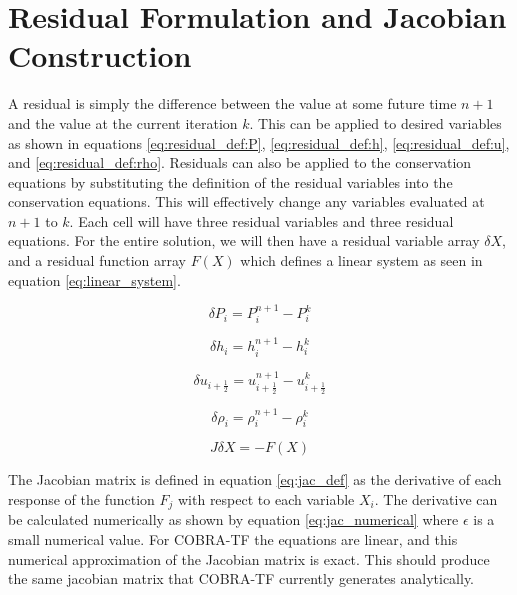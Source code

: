 \vspace*{-80mm}
\chapter{Residual Formulation and Jacobian Construction}
\label{chapter3:residual_formulation}
	    
    A residual is simply the difference between the value at some future time
    $n+1$ and the value at the current iteration $k$. This can be applied to
    desired variables as shown in equations %
    \eqref{eq:residual_def:P}, \eqref{eq:residual_def:h},
    \eqref{eq:residual_def:u}, and \eqref{eq:residual_def:rho}. Residuals can
    also be applied to the conservation equations by substituting the definition
    of the residual variables into the conservation equations. This will
    effectively change any variables evaluated at $n+1$ to $k$. Each cell will
    have three residual variables and three residual equations. For the entire
    solution, we will then have a residual variable array $\delta X$, and a
    residual function array $F(X)$ which defines a linear system as seen in 
    equation \eqref{eq:linear_system}.
        
    \begin{equation}
    	\label{eq:residual_def:P}
    	\delta P_{i} = P^{n+1}_{i} - P^{k}_{i}
    \end{equation}
    
    \begin{equation}
    	\label{eq:residual_def:h}
    	\delta h_{i} = h^{n+1}_{i} - h^{k}_{i}
    \end{equation}
    
    \begin{equation}
    	\label{eq:residual_def:u}
    	\delta u_{i+\frac{1}{2}} = u^{n+1}_{i+\frac{1}{2}} - u^{k}_{i+\frac{1}{2}}
    \end{equation}
    
    \begin{equation}
    	\label{eq:residual_def:rho}
    	\delta \rho_{i} = \rho^{n+1}_{i} - \rho^{k}_{i}
    \end{equation}
    
    \begin{equation}
    	\label{eq:linear_system}
    	J \delta X = - F(X)
    \end{equation}
    
    The Jacobian matrix is defined in equation \eqref{eq:jac_def} as the derivative
    of each response of the function $F_{j}$ with respect to each variable $X_{i}$.
    The derivative can be calculated numerically as shown by equation
    \eqref{eq:jac_numerical} where $\epsilon$ is a small numerical value. For
    COBRA-TF the equations are linear, and this numerical approximation
    of the Jacobian matrix is exact. This should produce the same jacobian
    matrix that COBRA-TF currently generates analytically. 
    
